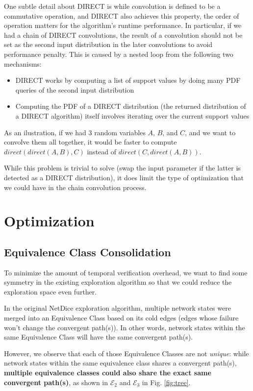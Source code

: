 One subtle detail about DIRECT is while convolution is defined to be a commutative operation, and 
DIRECT also achieves this property, the order of operation matters for the algorithm's runtime 
performance.
In particular, if we had a chain of DIRECT convolutions, the result of a convolution should not be set 
as the second input distribution in the later convolutions to avoid performance penalty.
This is caused by a nested loop from the following two mechanisms:
\begin{itemize}
    \item DIRECT works by computing a list of support values by doing many PDF queries of the second input
        distribution
    \item Computing the PDF of a DIRECT distribution (the returned distribution of a DIRECT 
        algorithm) itself involves iterating over the current support values
\end{itemize}

As an ilustration, if we had 3 random variables $A$, $B$, and  $C$, and we want 
to convolve them all together, it would be faster to compute $direct(direct(A, B), C)$ instead of 
$direct(C, direct(A, B))$.

While this problem is trivial to solve (swap the input parameter if the latter is detected as a 
DIRECT distribution), it does limit the type of optimization that we could have in the chain convolution 
process.

\section{Optimization}
\subsection{Equivalence Class Consolidation}
To minimize the amount of temporal verification overhead, we want to find some symmetry in the 
existing exploration algorithm so that we could reduce the exploration space even further.

In the original NetDice exploration algorithm, multiple network states were merged into an Equivalence 
Class based on its cold edges (edges whose failure won't change the convergent path(s)).
In other words, network states within the same Equivalence Class will have the same convergent path(s).

However, we observe that each of those Equivalence Classes are not \textit{unique}: while network states within 
the same equivalence class shares a convergent path(s), \textbf{multiple equivalence classes could also 
share the exact same convergent path(s)}, as shown in $\mathcal{E}_2$ and $\mathcal{E}_3$ in Fig. \ref{fig:tree}.

